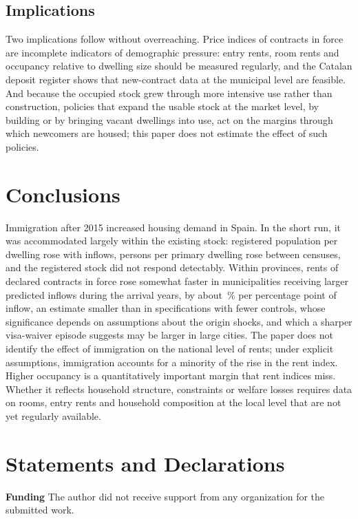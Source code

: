 \documentclass[11pt,a4paper]{article}
\begin{document}
\subsection{Implications}

Two implications follow without overreaching. Price indices of contracts in force are incomplete indicators of demographic pressure: entry rents, room rents and occupancy relative to dwelling size should be measured regularly, and the Catalan deposit register shows that new-contract data at the municipal level are feasible. And because the occupied stock grew through more intensive use rather than construction, policies that expand the usable stock at the market level, by building or by bringing vacant dwellings into use, act on the margins through which newcomers are housed; this paper does not estimate the effect of such policies.

\section{Conclusions}\label{sec:conclusion}

Immigration after 2015 increased housing demand in Spain. In the short run, it was accommodated largely within the existing stock: registered population per dwelling rose with inflows, persons per primary dwelling rose between censuses, and the registered stock did not respond detectably. Within provinces, rents of declared contracts in force rose somewhat faster in municipalities receiving larger predicted inflows during the arrival years, by about \cenArrB\,\% per percentage point of inflow, an estimate smaller than in specifications with fewer controls, whose significance depends on assumptions about the origin shocks, and which a sharper visa-waiver episode suggests may be larger in large cities. The paper does not identify the effect of immigration on the national level of rents; under explicit assumptions, immigration accounts for a minority of the rise in the rent index. Higher occupancy is a quantitatively important margin that rent indices miss. Whether it reflects household structure, constraints or welfare losses requires data on rooms, entry rents and household composition at the local level that are not yet regularly available.

\section*{Statements and Declarations}

\noindent\textbf{Funding} The author did not receive support from any organization for the submitted work.
\end{document}
